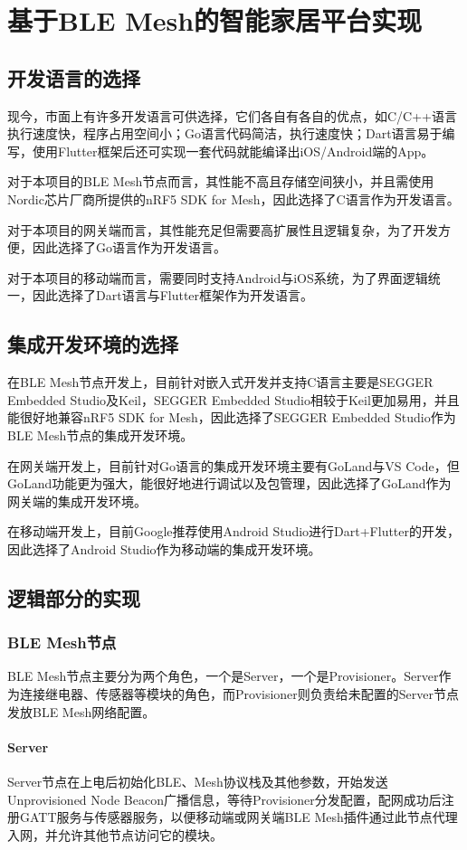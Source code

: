 \chapter{基于BLE Mesh的智能家居平台实现}
\section{开发语言的选择}
现今，市面上有许多开发语言可供选择，它们各自有各自的优点，如C/C++语言执行速度快，程序占用空间小；Go语言代码简洁，执行速度快；Dart语言易于编写，使用Flutter框架后还可实现一套代码就能编译出iOS/Android端的App。

对于本项目的BLE Mesh节点而言，其性能不高且存储空间狭小，并且需使用Nordic芯片厂商所提供的nRF5 SDK for Mesh，因此选择了C语言作为开发语言。

对于本项目的网关端而言，其性能充足但需要高扩展性且逻辑复杂，为了开发方便，因此选择了Go语言作为开发语言。

对于本项目的移动端而言，需要同时支持Android与iOS系统，为了界面逻辑统一，因此选择了Dart语言与Flutter框架作为开发语言。

\section{集成开发环境的选择}
在BLE Mesh节点开发上，目前针对嵌入式开发并支持C语言主要是SEGGER Embedded Studio及Keil，SEGGER Embedded Studio相较于Keil更加易用，并且能很好地兼容nRF5 SDK for Mesh，因此选择了SEGGER Embedded Studio作为BLE Mesh节点的集成开发环境。

在网关端开发上，目前针对Go语言的集成开发环境主要有GoLand与VS Code，但GoLand功能更为强大，能很好地进行调试以及包管理，因此选择了GoLand作为网关端的集成开发环境。

在移动端开发上，目前Google推荐使用Android Studio进行Dart+Flutter的开发，因此选择了Android Studio作为移动端的集成开发环境。

\section{逻辑部分的实现}
\subsection{BLE Mesh节点}
BLE Mesh节点主要分为两个角色，一个是Server，一个是Provisioner。Server作为连接继电器、传感器等模块的角色，而Provisioner则负责给未配置的Server节点发放BLE Mesh网络配置。

\subsubsection{Server}
Server节点在上电后初始化BLE、Mesh协议栈及其他参数，开始发送Unprovisioned Node Beacon广播信息，等待Provisioner分发配置，配网成功后注册GATT服务与传感器服务，以便移动端或网关端BLE Mesh插件通过此节点代理入网，并允许其他节点访问它的模块。

